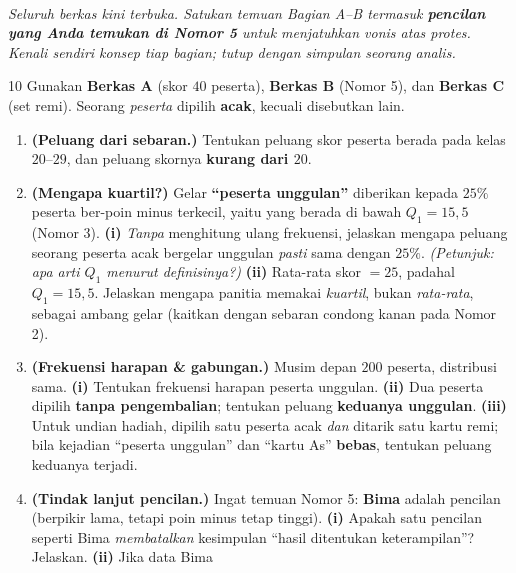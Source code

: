 \documentclass[11pt]{article}
\newenvironment{subsoal}{%
  \begin{enumerate}[label=\textbf{(\alph*)},leftmargin=1.8em,itemsep=5pt,topsep=3pt]}%
  {\end{enumerate}}
\begin{document}
\clearpage
{}\\[0.2em]
\small\emph{Seluruh berkas kini terbuka. Satukan temuan Bagian A--B termasuk
\textbf{pencilan yang Anda temukan di Nomor 5} untuk menjatuhkan vonis atas
protes. Kenali sendiri konsep tiap bagian; tutup dengan simpulan seorang analis.}\normalsize

\bigskip

\begin{soal}{10}
Gunakan \textbf{Berkas A} (skor $40$ peserta), \textbf{Berkas B} (Nomor 5), dan
\textbf{Berkas C} (set remi). Seorang \emph{peserta} dipilih \textbf{acak}, kecuali
disebutkan lain.
\begin{subsoal}
  \item \textbf{(Peluang dari sebaran.)} Tentukan peluang skor peserta berada pada
        kelas $20$--$29$, dan peluang skornya \textbf{kurang dari $20$}.
  \item \textbf{(Mengapa kuartil?)} Gelar \textbf{``peserta unggulan''} diberikan
        kepada $25\%$ peserta ber-poin minus terkecil, yaitu yang berada di bawah
        $Q_1=15{,}5$ (Nomor 3). \textbf{(i)} \emph{Tanpa} menghitung ulang frekuensi,
        jelaskan mengapa peluang seorang peserta acak bergelar unggulan \emph{pasti}
        sama dengan $25\%$. \emph{(Petunjuk: apa arti $Q_1$ menurut definisinya?)}
        \textbf{(ii)} Rata-rata skor $=25$, padahal $Q_1=15{,}5$. Jelaskan mengapa
        panitia memakai \emph{kuartil}, bukan \emph{rata-rata}, sebagai ambang gelar
        (kaitkan dengan sebaran condong kanan pada Nomor 2).
  \item \textbf{(Frekuensi harapan \& gabungan.)} Musim depan $200$ peserta,
        distribusi sama. \textbf{(i)} Tentukan frekuensi harapan peserta unggulan.
        \textbf{(ii)} Dua peserta dipilih \textbf{tanpa pengembalian}; tentukan
        peluang \textbf{keduanya unggulan}. \textbf{(iii)} Untuk undian hadiah,
        dipilih satu peserta acak \emph{dan} ditarik satu kartu remi; bila kejadian
        ``peserta unggulan'' dan ``kartu As'' \textbf{bebas}, tentukan peluang
        keduanya terjadi.
  \item \textbf{(Tindak lanjut pencilan.)} Ingat temuan Nomor 5: \textbf{Bima}
        adalah pencilan (berpikir lama, tetapi poin minus tetap tinggi).
        \textbf{(i)} Apakah satu pencilan seperti Bima \emph{membatalkan} kesimpulan
        ``hasil ditentukan keterampilan''? Jelaskan. \textbf{(ii)} Jika data Bima

\end{subsoal}
\end{soal}
\end{document}
